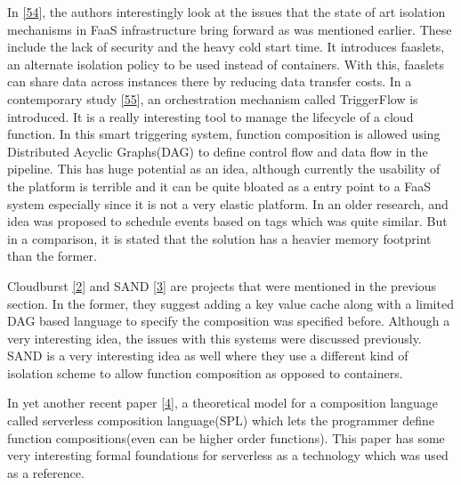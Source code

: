 \documentclass[12pt,titlepage]{article}
\begin{document}
In \hyperref[ref:54]{[54}], the authors interestingly look at the issues that the state of art
isolation mechanisms in FaaS infrastructure bring forward as was mentioned
earlier. These include the lack of security and the heavy cold start time. It
introduces faaslets, an alternate isolation policy to be used instead of
containers. With this, faaslets can share data across instances there by
reducing data transfer costs. In a contemporary study \hyperref[ref:55]{[55}], an
orchestration mechanism called TriggerFlow is introduced. It is a really
interesting tool to manage the lifecycle of a cloud function. In this smart
triggering system, function composition is allowed using Distributed Acyclic
Graphs(DAG) to define control flow and data flow in the pipeline. This has huge
potential as an idea, although currently the usability of the platform is
terrible and it can be quite bloated as a entry point to a FaaS system
especially since it is not a very elastic platform. In an older research, and
idea was proposed to schedule events based on tags which was quite similar. But
in a comparison, it is stated that the solution has a heavier memory footprint
than the former.


Cloudburst \hyperref[ref:2]{[2}] and SAND \hyperref[ref:3]{[3}] are projects that were mentioned in the previous
section. In the former, they suggest adding a key value cache along with
a limited DAG based language to specify the composition was specified before.
Although a very interesting idea, the issues with this systems were discussed
previously. SAND is a very interesting idea as well where they use a different
kind of isolation scheme to allow function composition as opposed to containers.

In yet another recent paper \hyperref[ref:4]{[4}], a theoretical model for a composition
language called serverless composition language(SPL) which lets the programmer
define function compositions(even can be higher order functions). This paper has
some very interesting formal foundations for serverless as a technology which
was used as a reference.
\end{document}

